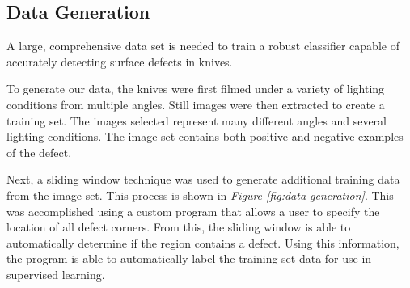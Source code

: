 \documentclass[letterpaper, 10 pt, conference]{ieeeconf}  %
\begin{document}
\subsection{Data Generation}


A large, comprehensive data set is needed to train a robust classifier capable of accurately detecting surface defects in knives.

To generate our data, the knives were first filmed under a variety of lighting conditions from multiple angles. Still images were then extracted to create a training set. The images selected represent many different angles and several lighting conditions. The image set contains both positive and negative examples of the defect.

Next, a sliding window technique was used to generate additional training data from the image set. This process is shown in \textit{Figure \ref{fig:data generation}}. This was accomplished using a custom program that allows a user to specify the location of all defect corners. From this, the sliding window is able to automatically determine if the region contains a defect. Using this information, the program is able to automatically label the training set data for use in supervised learning.
\end{document}
